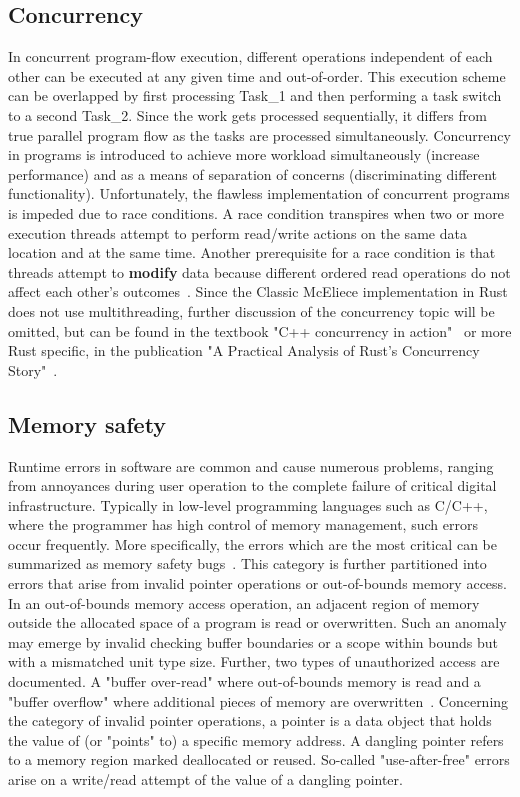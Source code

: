 \documentclass[11pt,
  oneside,openany,    %
]{scrreprt}
\begin{document}
\subsection{Concurrency}
In concurrent program-flow execution, different operations independent of each other can be executed at any given time and out-of-order. This execution scheme can be overlapped by first processing Task\_1 and then performing a task switch to a second Task\_2. Since the work gets processed sequentially, it differs from true parallel program flow as the tasks are processed simultaneously. Concurrency in programs is introduced to achieve more workload simultaneously (increase performance) and as a means of separation of concerns (discriminating different functionality). Unfortunately, the flawless implementation of concurrent programs is impeded due to race conditions. A race condition transpires when two or more execution threads attempt to perform read/write actions on the same data location and at the same time. Another prerequisite for a race condition is that threads attempt to \textbf{modify} data because different ordered read operations do not affect each other's outcomes~\cite{cppConcurrency, DBLP:journals/corr/abs-1904-12210}. Since the Classic McEliece implementation in Rust does not use multithreading, further discussion of the concurrency topic will be omitted, but can be found in the textbook "C++ concurrency in action"~\cite{cppConcurrency} or more Rust specific, in the publication "A Practical Analysis of Rust's Concurrency Story"~\cite{DBLP:journals/corr/abs-1904-12210}.

\subsection{Memory safety}
Runtime errors in software are common and cause numerous problems, ranging from annoyances during user operation to the complete failure of critical digital infrastructure. Typically in low-level programming languages such as C/C++, where the programmer has high control of memory management, such errors occur frequently. More specifically, the errors which are the most critical can be summarized as memory safety bugs~\cite{mitreTop25CVE}. This category is further partitioned into errors that arise from invalid pointer operations or out-of-bounds memory access. In an out-of-bounds memory access operation, an adjacent region of memory outside the allocated space of a program is read or overwritten. Such an anomaly may emerge by invalid checking buffer boundaries or a scope within bounds but with a mismatched unit type size. Further, two types of unauthorized access are documented. A "buffer over-read" where out-of-bounds memory is read and a "buffer overflow" where additional pieces of memory are overwritten~\cite{memsafetyHui}.
Concerning the category of invalid pointer operations, a pointer is a data object that holds the value of (or "points" to) a specific memory address. A dangling pointer refers to a memory region marked deallocated or reused. So-called "use-after-free" errors arise on a write/read attempt of the value of a dangling pointer. 
\end{document}
